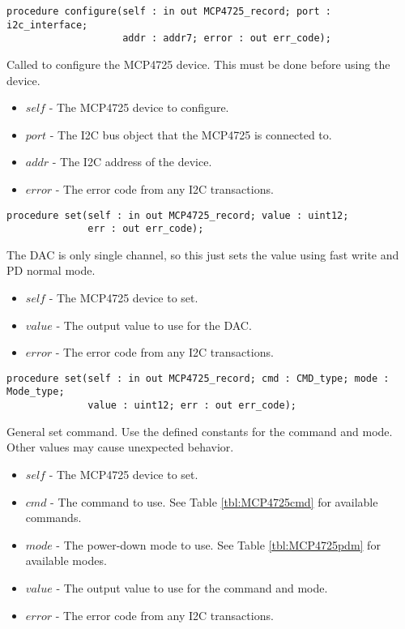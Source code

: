 \documentclass[10pt, openany]{book}
\begin{document}
\begin{lstlisting}
procedure configure(self : in out MCP4725_record; port : i2c_interface;
                    addr : addr7; error : out err_code);
\end{lstlisting}
Called to configure the MCP4725 device.  This must be done before using the device.
\begin{itemize}
  \item $self$ - The MCP4725 device to configure.
  \item $port$ - The I2C bus object that the MCP4725 is connected to.
  \item $addr$ - The I2C address of the device.
  \item $error$ - The error code from any I2C transactions.
\end{itemize}

\begin{lstlisting}
procedure set(self : in out MCP4725_record; value : uint12;
              err : out err_code);
\end{lstlisting}
The DAC is only single channel, so this just sets the value using fast write and PD normal mode.
\begin{itemize}
  \item $self$ - The MCP4725 device to set.
  \item $value$ - The output value to use for the DAC.
  \item $error$ - The error code from any I2C transactions.
\end{itemize}

\begin{lstlisting}
procedure set(self : in out MCP4725_record; cmd : CMD_type; mode : Mode_type;
              value : uint12; err : out err_code);
\end{lstlisting}
General set command.  Use the defined constants for the command and mode.  Other values may cause unexpected behavior.
\begin{itemize}
  \item $self$ - The MCP4725 device to set.
  \item $cmd$ - The command to use.  See Table \ref{tbl:MCP4725cmd} for available commands.
  \item $mode$ - The power-down mode to use.  See Table \ref{tbl:MCP4725pdm} for available modes.
  \item $value$ - The output value to use for the command and mode.
  \item $error$ - The error code from any I2C transactions.
\end{itemize}
\end{document}
